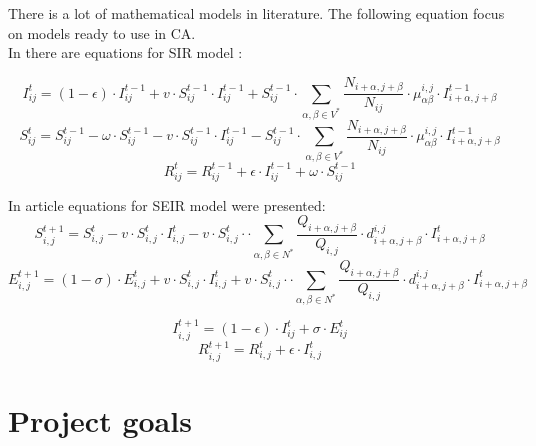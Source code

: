 \documentclass[a4paper, 11pt]{article}
\begin{document}
	
	
	There is a lot of mathematical models in literature. The following equation focus on models ready to use in CA.\\
	In \cite{WHITE} there are equations for SIR model :
	
	\begin{equation}
	I^t_{ij}=\left(1-\epsilon\right)\cdot I^{t-1}_{ij}+v\cdot S^{t-1}_{ij}\cdot I^{t-1}_{ij}+S^{t-1}_{ij} \cdot \sum\limits_{\alpha,\beta\in V^{*}}\frac{N_{i+\alpha,j+\beta}}{N_{ij}}\cdot \mu^{i,j}_{\alpha\beta}\cdot I^{t-1}_{i+\alpha,j+\beta} 
	\end{equation}		
		\begin{equation}
	S^t_{ij}=S^{t-1}_{ij}-\omega\cdot S^{t-1}_{ij}-v\cdot S^{t-1}_{ij}\cdot I^{t-1}_{ij}-S^{t-1}_{ij} \cdot \sum\limits_{\alpha,\beta\in V^{*}}\frac{N_{i+\alpha,j+\beta}}{N_{ij}}\cdot \mu^{i,j}_{\alpha\beta}\cdot I^{t-1}_{i+\alpha,j+\beta} 
\end{equation}	
	\begin{equation}
	R^t_{ij}=R^{t-1}_{ij}+\epsilon\cdot I^{t-1}_{ij}+\omega\cdot S^{t-1}_{ij}
\end{equation}	
	
	
	In article \cite{cisse} equations for SEIR model were presented: 
			\begin{equation}
	S^{t+1}_{i,j}=S^{t}_{i,j}-v\cdot S^{t}_{i,j}\cdot I^t_{i,j} -v\cdot S^{t}_{i,j}\cdot \cdot \sum\limits_{\alpha,\beta\in N^{*}}\frac{Q_{i+\alpha,j+\beta}}{Q_{i,j}}\cdot d^{i,j}_{i+\alpha,j+\beta}\cdot I^{t}_{i+\alpha,j+\beta} 
\end{equation}	
	\begin{equation}
	E^{t+1}_{i,j}=(1-\sigma)\cdot E^t_{i,j}+v\cdot S^{t}_{i,j}\cdot I^t_{i,j} +v\cdot S^{t}_{i,j}\cdot \cdot \sum\limits_{\alpha,\beta\in N^{*}}\frac{Q_{i+\alpha,j+\beta}}{Q_{i,j}}\cdot d^{i,j}_{i+\alpha,j+\beta}\cdot I^{t}_{i+\alpha,j+\beta}
	\end{equation}		

\begin{equation}
I^{t+1}_{i,j}=\left(1-\epsilon\right)\cdot I^{t}_{ij}+\sigma\cdot E^t_{ij}
\end{equation}
	\begin{equation}
	R^{t+1}_{i,j}=R^{t}_{i,j}+\epsilon\cdot I^{t}_{i,j}
\end{equation}	
	

	

\section{Project goals}
\end{document}
